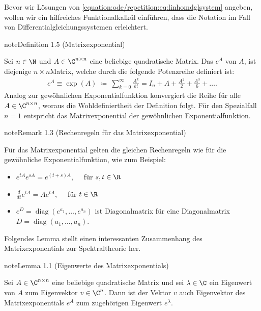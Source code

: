 \documentclass[letterpaper,10pt,german]{jupyterBook}
\begin{document}
\sphinxAtStartPar
Bevor wir Lösungen von \eqref{equation:ode/repetition:eq:linhomdglsystem} angeben, wollen wir ein hilfreiches Funktionalkalkül einführen, dass die Notation im Fall von Differentialgleichungssystemen erleichtert.
\label{ode/repetition:definition-12}
\begin{sphinxadmonition}{note}{Definition 1.5 (Matrixexponential)}



\sphinxAtStartPar
Sei \(n \in \N\) und \(A \in \C^{n \times n}\) eine beliebige quadratische Matrix.
Das  \(e^A\) von \(A\), ist diejenige \(n\times n\)\sphinxhyphen{}Matrix, welche durch die folgende Potenzreihe definiert ist:
\begin{equation*}
\begin{split}e^A \equiv \exp(A) \ \coloneqq \ \sum_{k=0}^\infty \frac{A^k}{k!} = I_n + A + \frac{A^2}{2} + \frac{A^3}{6} + \ldots.\end{split}
\end{equation*}
\sphinxAtStartPar
Analog zur gewöhnlichen Exponentialfunktion konvergiert die Reihe für alle \(A \in \C^{n \times n}\), woraus die Wohldefiniertheit der Definition folgt.
Für den Spezialfall \(n=1\) entspricht das Matrixexponential der gewöhnlichen Exponentialfunktion.
\end{sphinxadmonition}
\label{ode/repetition:rem:matrixexponentialregeln}
\begin{sphinxadmonition}{note}{Remark 1.3 (Rechenregeln für das Matrixexponential)}



\sphinxAtStartPar
Für das Matrixexponential gelten die gleichen Rechenregeln wie für die gewöhnliche Exponentialfunktion, wie zum Beispiel:
\begin{itemize}
\item {} 
\sphinxAtStartPar
\(e^{tA}e^{sA} = e^{(t+s)A}, \quad\) für \(s,t \in \R\)

\item {} 
\sphinxAtStartPar
\(\frac{d}{dt} e^{tA} = Ae^{tA}, \quad\) für \(t \in \R\)

\item {} 
\sphinxAtStartPar
\( e^{D} = \operatorname{diag}(e^{a_1}, \ldots, e^{a_n})\) ist Diagonalmatrix für eine Diagonalmatrix \(D = \operatorname{diag}(a_1, \ldots, a_n)\).

\end{itemize}
\end{sphinxadmonition}

\sphinxAtStartPar
Folgendes Lemma stellt einen interessanten Zusammenhang des Matrixexponentials zur Spektraltheorie her.
\label{ode/repetition:lem:mpotew}
\begin{sphinxadmonition}{note}{Lemma 1.1 (Eigenwerte des Matrixexponentials)}



\sphinxAtStartPar
Sei \(A \in \C^{n\times n}\) eine beliebige quadratische Matrix und sei \(\lambda \in \C\) ein Eigenwert von \(A\) zum
Eigenvektor \(v \in \C^n\).
Dann ist der Vektor \(v\) auch Eigenvektor des Matrixexponentials \(e^A\) zum zugehörigen Eigenwert \(e^\lambda\).
\end{sphinxadmonition}
\end{document}
